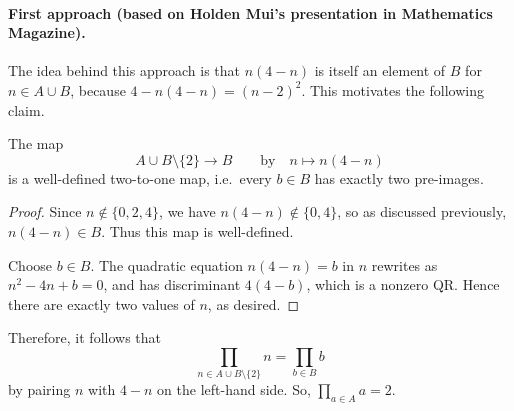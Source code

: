 \documentclass[11pt]{scrartcl}
\begin{document}
\paragraph{First approach (based on Holden Mui's presentation in Mathematics Magazine).}
The idea behind this approach is that $n(4-n)$
is itself an element of $B$ for $n \in A \cup B$,
because $4 - n(4-n) = (n-2)^2$.
This motivates the following claim.
\begin{claim*}
  The map
  \[ A \cup B \setminus \{2\} \to B
    \qquad \text{by}\quad n \mapsto n(4-n) \]
  is a well-defined two-to-one map,
  i.e.\ every $b \in B$ has exactly two pre-images.
\end{claim*}
\begin{proof}
  Since $n \notin \{0,2,4\}$,
  we have $n(4-n) \notin \{0,4\}$,
  so as discussed previously, $n(4-n) \in B$.
  Thus this map is well-defined.

  Choose $b \in B$.
  The quadratic equation $n(4-n) = b$ in $n$
  rewrites as $n^2-4n+b=0$,
  and has discriminant $4(4-b)$,
  which is a nonzero QR.
  Hence there are exactly two values of $n$, as desired.
\end{proof}
Therefore, it follows that
\[ \prod_{n \in A \cup B \setminus \{2\}} n
  = \prod_{b \in B} b \]
by pairing $n$ with $4-n$ on the left-hand side.
So, $\prod_{a \in A} a = 2$.
\end{document}
